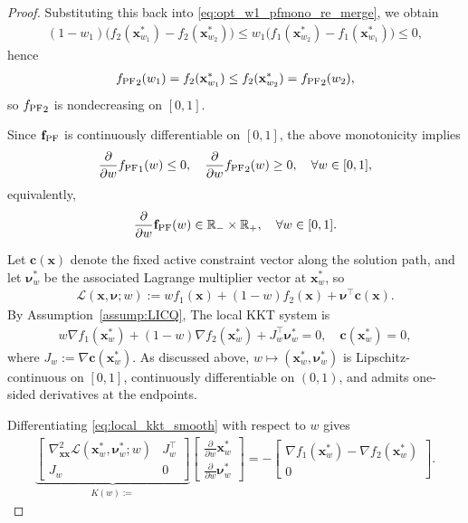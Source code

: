 \documentclass{article}
\newcommand{\bx}{\mathbf{x}}
\newcommand{\R}{\mathbb{R}}
\newcommand{\fPF}{{\mathbf{f}_{\rm PF}}}
\begin{document}
\begin{proof}
Substituting this back into \eqref{eq:opt_w1_pfmono_re_merge}, we obtain
\begin{align}
(1-w_1)\big(f_2(\bx_{w_1}^*)-f_2(\bx_{w_2}^*)\big)
\le
w_1\big(f_1(\bx_{w_2}^*)-f_1(\bx_{w_1}^*)\big)\le 0,
\end{align}
hence
\begin{align}
{f_{\rm PF}}_2(w_1)=f_2(\bx_{w_1}^*)\le f_2(\bx_{w_2}^*)={f_{\rm PF}}_2(w_2),
\end{align}
so ${f_{\rm PF}}_2$ is nondecreasing on $[0,1]$.

Since $\fPF$ is continuously differentiable on $[0,1]$, the above monotonicity implies
\begin{align}
\frac{\partial}{\partial w}{f_{\rm PF}}_1(w)\le 0,
\quad
\frac{\partial}{\partial w}{f_{\rm PF}}_2(w)\ge 0,
\quad \forall w\in[0,1],
\end{align}
equivalently,
\begin{align}
\frac{\partial}{\partial w}\fPF(w)\in \R_- \times \R_+, \quad \forall w\in[0,1].
\end{align}

Let $\mathbf c(\bx)$ denote the fixed active constraint vector along the solution path, and let $\boldsymbol{\nu}_w^*$ be the associated Lagrange multiplier vector at $\bx_w^*$, so 
\begin{align}
\mathcal L(\bx,\boldsymbol{\nu};w):=wf_1(\bx)+(1-w)f_2(\bx)+\boldsymbol{\nu}^\top\mathbf c(\bx).
\end{align}
By Assumption~\ref{assump:LICQ}, The local KKT system is
\begin{align}
w\nabla f_1(\bx_w^*)+(1-w)\nabla f_2(\bx_w^*)+J_w^\top\boldsymbol{\nu}_w^*=0,\quad \mathbf c(\bx_w^*)=0,
\label{eq:local_kkt_smooth}
\end{align}
where $J_w:=\nabla\mathbf c(\bx_w^*)$. As discussed above, $w\mapsto(\bx_w^*,\boldsymbol{\nu}_w^*)$ is Lipschitz-continuous on $[0,1]$, continuously differentiable on $(0,1)$, and admits one-sided derivatives at the endpoints.

Differentiating \eqref{eq:local_kkt_smooth} with respect to $w$ gives
\begin{align}
\underbrace{\begin{bmatrix}\nabla_{\bx\bx}^2\mathcal L(\bx_w^*,\boldsymbol{\nu}_w^*;w)&J_w^\top\\J_w&0\end{bmatrix}}_{K(w):=}\begin{bmatrix}\frac{\partial}{\partial w}\bx_w^*\\\frac{\partial}{\partial w}\boldsymbol{\nu}_w^*\end{bmatrix}=-\begin{bmatrix}\nabla f_1(\bx_w^*)-\nabla f_2(\bx_w^*)\\0\end{bmatrix}.
\label{eq:diff_kkt_zprime_consistent}
\end{align}


\end{proof}
\end{document}
